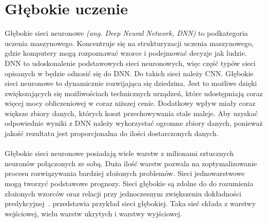 \section{Głębokie uczenie}
\label{sec:deeplearn}
Głębokie sieci neuronowe \textit{(ang. Deep Neural Network, DNN)} to podkategoria uczenia maszynowego. Koncentruje się na strukturyzacji uczenia maszynowego, gdzie komputery mogą rozpoznawać wzorce i podejmować decyzje jak ludzie. DNN to udoskonalenie podstawowych sieci neuronowych, więc część typów sieci opisanych w  będzie odnosić się do DNN. Do takich sieci należy CNN. Głębokie sieci neuronowe to dynamicznie rozwijająca się dziedzina. Jest to możliwe dzięki zwiększających się możliwościach technicznych urządzeń, które udostępniają coraz więcej mocy obliczeniowej w coraz niższej cenie. Dodatkowy wpływ miały coraz większe zbiory danych, których koszt przechowywania stale maleje. Aby uzyskać odpowiednie wyniki z DNN należy wykorzystać ogromne zbiory danych, ponieważ jakość rezultatu jest proporcjonalna do ilości dostarczonych danych.
\\ \\
Głębokie sieci neuronowe posiadają wiele warstw z milionami sztucznych neuronów połączonych ze sobą. Duża ilość warstw pozwala na zoptymalizowanie procesu rozwiązywania bardziej złożonych problemów. Sieci jednowarstwowe mogą tworzyć podstawowe prognozy. Sieci głębokie są zdolne do do rozumienia złożonych wzorców oraz relacji przy jednoczesnym zwiększeniu dokładności predykcyjnej~\cite{Crabtree}.  przedstawia przykład sieci głębokiej. Taka sieć składa z warstwy wejściowej, wielu warstw ukrytych i warstwy wyjściowej.

